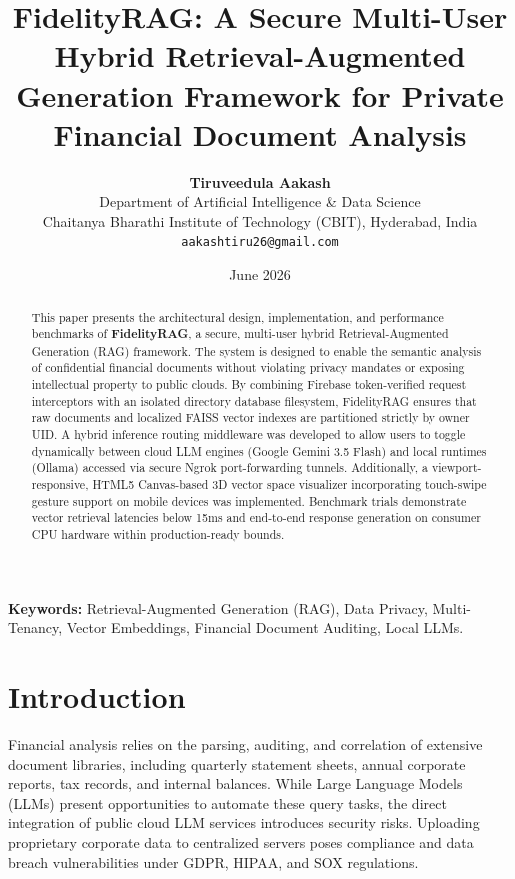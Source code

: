 \documentclass[11pt,journal,onecolumn]{article}
\begin{document}
\title{\textbf{FidelityRAG: A Secure Multi-User Hybrid Retrieval-Augmented Generation Framework for Private Financial Document Analysis}}

\author{
  \textbf{Tiruveedula Aakash} \\
  Department of Artificial Intelligence \& Data Science \\
  Chaitanya Bharathi Institute of Technology (CBIT), Hyderabad, India \\
  \texttt{aakashtiru26@gmail.com}
}
\date{June 2026}

\maketitle

\begin{abstract}
This paper presents the architectural design, implementation, and performance benchmarks of \textbf{FidelityRAG}, a secure, multi-user hybrid Retrieval-Augmented Generation (RAG) framework. The system is designed to enable the semantic analysis of confidential financial documents without violating privacy mandates or exposing intellectual property to public clouds. By combining Firebase token-verified request interceptors with an isolated directory database filesystem, FidelityRAG ensures that raw documents and localized FAISS vector indexes are partitioned strictly by owner UID. A hybrid inference routing middleware was developed to allow users to toggle dynamically between cloud LLM engines (Google Gemini 3.5 Flash) and local runtimes (Ollama) accessed via secure Ngrok port-forwarding tunnels. Additionally, a viewport-responsive, HTML5 Canvas-based 3D vector space visualizer incorporating touch-swipe gesture support on mobile devices was implemented. Benchmark trials demonstrate vector retrieval latencies below 15ms and end-to-end response generation on consumer CPU hardware within production-ready bounds.
\end{abstract}

\textbf{Keywords:} Retrieval-Augmented Generation (RAG), Data Privacy, Multi-Tenancy, Vector Embeddings, Financial Document Auditing, Local LLMs.

\section{Introduction}
Financial analysis relies on the parsing, auditing, and correlation of extensive document libraries, including quarterly statement sheets, annual corporate reports, tax records, and internal balances. While Large Language Models (LLMs) present opportunities to automate these query tasks, the direct integration of public cloud LLM services introduces security risks. Uploading proprietary corporate data to centralized servers poses compliance and data breach vulnerabilities under GDPR, HIPAA, and SOX regulations.
\end{document}
